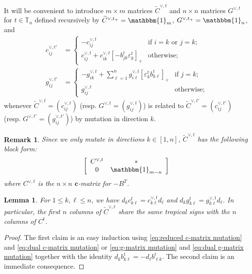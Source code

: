 \documentclass{amsart}
\newtheorem{lemma}[theorem]{Lemma}
\newtheorem{remark}[theorem]{Remark}
\numberwithin{theorem}{section}
\newcommand{\bfc}{\boldsymbol{c}}
\newcommand{\TT}{\mathbb{T}}
\newcommand{\bOne}{\mathbbm{1}}
\begin{document}
  It will be convenient to introduce $m\times m$ matrices $\widetilde C^{\vee,t}$ and $n\times n$ matrices $G^{\vee,t}$ for $t\in\TT_n$ defined recursively by $\widetilde C^{\vee,t_+}=\bOne_m$, $G^{\vee,t_+}=\bOne_n$, and 
  \begin{align}
    \label{eq:dual c-matrix mutation}
    c^{\vee,t'}_{ij} &= \begin{cases} -c^{\vee,t}_{ij} & \text{if $i=k$ or $j=k$;}\\ c^{\vee,t}_{ij} + c^{\vee,t}_{ik} [-b^t_{jk} \varepsilon^t_k]_+ & \text{otherwise;} \end{cases}\\
    \label{eq:dual g-matrix mutation}
    g^{\vee,t'}_{ij} &= \begin{cases} -g^{\vee,t}_{ik} + \sum\limits_{\ell=1}^n g^{\vee,t}_{i \ell} [\varepsilon^t_k b^t_{k \ell}]_+ & \text{if $j=k$;}\\ g^{\vee,t}_{ij} & \text{otherwise;} \end{cases}
  \end{align}
  whenever $\widetilde C^{\vee,t}=(c^{\vee,t}_{ij})$ (resp. $G^{\vee,t}=(g^{\vee,t}_{ij})$) is related to $\widetilde C^{\vee,t'}=(c^{\vee,t'}_{ij})$ (resp. $G^{\vee,t'}=(g^{\vee,t'}_{ij})$) by mutation in direction $k$.
  \begin{remark}
    \label{rem:dual c-matrix structure}
    Since we only mutate in directions $k\in[1,n]$, $\widetilde C^{\vee,t}$ has the following block form:
    \[\left[\begin{array}{cc} C^{\vee,t} & *\\ 0 & \bOne_{m-n}\end{array}\right]\]
    where $C^{\vee,t}$ is the $n\times n$ $\bfc$-matrix for $-B^T$.
  \end{remark}
  \begin{lemma}
    \label{le:tropical signs}
    For $1\le k,\ell\le n$, we have $d_k c^t_{k\ell} = c^{\vee,t}_{k\ell} d_\ell $ and $d_k g^t_{k\ell} = g^{\vee,t}_{k\ell} d_\ell$.
    In particular, the first $n$ columns of $\widetilde C^{\vee,t}$ share the same tropical signs with the $n$ columns of $C^t$.
  \end{lemma}
  \begin{proof}
    The first claim is an easy induction using \eqref{eq:reduced c-matrix mutation} and \eqref{eq:dual c-matrix mutation} or \eqref{eq:g-matrix mutation} and \eqref{eq:dual g-matrix mutation} together with the identity $d_k b^t_{k\ell} = - d_\ell b^t_{\ell k}$.
    The second claim is an immediate consequence.
  \end{proof}
\end{document}
